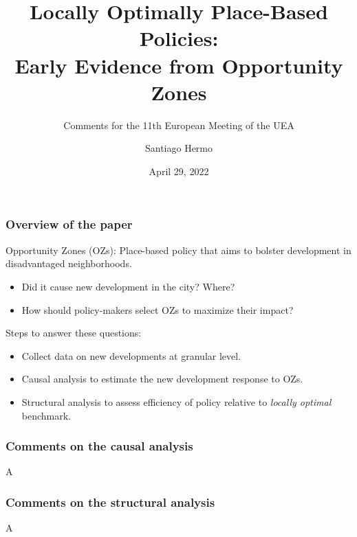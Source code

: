 \documentclass[aspectratio=169, t]{beamer}
\title{Locally Optimally Place-Based Policies: \\ 
       Early Evidence from Opportunity Zones}
\subtitle{\vspace{3mm} Comments for the 11th European Meeting of the UEA}
\date{April 29, 2022}
\author{Santiago Hermo\vspace{-3mm} }
\institute{Brown University}
\begin{document}
\maketitle



\begin{frame}
    \frametitle{Overview of the paper}
    
    Opportunity Zones (OZs): Place-based policy that aims to bolster development in disadvantaged neighborhoods.
    \begin{itemize}
        \item Did it cause new development in the city? Where?
        \item How should policy-makers select OZs to maximize their impact?
    \end{itemize}
    
    \pause
    \vspace{4mm}
    Steps to answer these questions:
    \begin{itemize}
        \item Collect data on new developments at granular level.
        \item Causal analysis to estimate the new development response to OZs.
        \item Structural analysis to assess efficiency of policy relative to \textit{locally optimal} benchmark.
    \end{itemize}

\end{frame}

\begin{frame}
    \frametitle{Comments on the causal analysis}
    
    A

\end{frame}

\begin{frame}
    \frametitle{Comments on the structural analysis}
    
    A

\end{frame}
\end{document}
